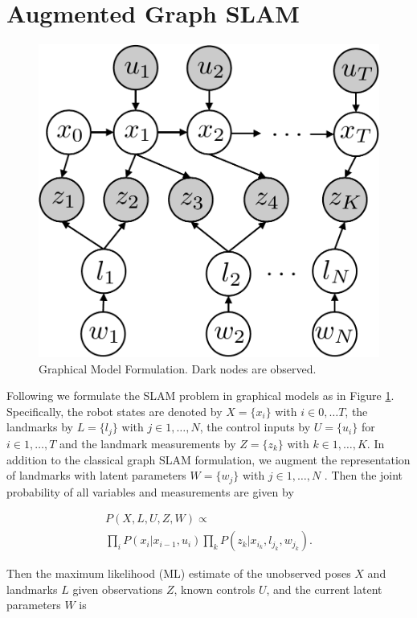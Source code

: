 \section{Augmented Graph SLAM}
\label{sec:model}
\begin{figure}[!t]
\begin{center}
 \includegraphics[width=0.5\columnwidth]{fig/model} 
\end{center}
\caption{Graphical Model Formulation. Dark nodes are observed.}
\label{fig:model}
\end{figure}

Following \cite{isam} we formulate the SLAM problem in graphical models as in Figure \ref{fig:model}. Specifically, the robot states are denoted by $X = \{x_i\}$ with $i \in 0, \dots T$, the landmarks by $L = \{l_j\}$ with $j \in 1,\dots, N$, the control inputs by $U = \{u_i\}$ for $i \in 1,\dots, T$ and the landmark measurements by $Z = \{z_k\}$ with $k \in 1, \dots, K$. In addition to the classical graph SLAM formulation, we augment the representation of landmarks with latent parameters $W = \{w_j\}$ with $j \in 1, \dots, N$ . Then the joint probability of all variables and measurements are given by

\begin{multline}
P(X, L, U, Z, W) \propto  \\
\prod\limits_{i}P(x_i|x_{i-1}, u_i)\prod\limits_{k}P(z_k|x_{i_k}, l_{j_k}, w_{j_k}).
\label{eq:jointProb}
\end{multline}

Then the maximum likelihood (ML) estimate of the unobserved poses $X$ and landmarks $L$ given observations $Z$, known controls $U$, and the current latent parameters $W$ is

